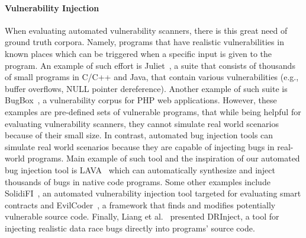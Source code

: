 \paragraph{Vulnerability Injection}
When evaluating automated vulnerability scanners, there is this great need of ground truth corpora. Namely, programs that have 
realistic vulnerabilities in known places which can be triggered when a specific input is given to the program. An example of such effort
is Juliet~\cite{black2018juliet}, a suite that consists of thousands of small programs in C/C++ and Java, that contain various 
vulnerabilities (e.g., buffer overflows, NULL pointer dereference). Another example of such suite is BugBox~\cite{nilson2013bugbox}, 
a vulnerability corpus for PHP web applications. However, these examples are pre-defined sets of vulnerable programs, that while
being helpful for evaluating vulnerability scanners, they cannot simulate real world scenarios because of their small size.  In contrast,
automated bug injection tools can simulate real world scenarios because they are capable of injecting bugs in real-world programs. Main 
example of such tool and the inspiration of our automated bug injection tool is LAVA~\cite{dolan2016lava} which can automatically synthesize 
and inject thousands of bugs in native code programs.  Some other examples include SolidiFI~\cite{ghaleb2020effective}, an automated
vulnerability injection tool targeted for evaluating smart contracts and EvilCoder~\cite{pewny2016evilcoder}, a framework that finds and
modifies potentially vulnerable source code. Finally, Liang et al.~\cite{liang2020automated} presented DRInject, a tool for injecting 
realistic data race bugs directly into programs' source code.





